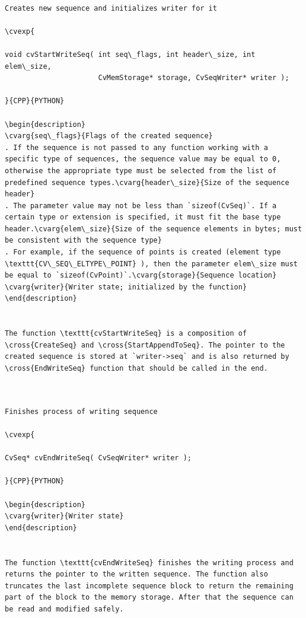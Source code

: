 \label{StartWriteSeq}
\begin{verbatim}

Creates new sequence and initializes writer for it

\cvexp{

void cvStartWriteSeq( int seq\_flags, int header\_size, int elem\_size,
                      CvMemStorage* storage, CvSeqWriter* writer );

}{CPP}{PYTHON}

\begin{description}
\cvarg{seq\_flags}{Flags of the created sequence}
. If the sequence is not passed to any function working with a specific type of sequences, the sequence value may be equal to 0, otherwise the appropriate type must be selected from the list of predefined sequence types.\cvarg{header\_size}{Size of the sequence header}
. The parameter value may not be less than `sizeof(CvSeq)`. If a certain type or extension is specified, it must fit the base type header.\cvarg{elem\_size}{Size of the sequence elements in bytes; must be consistent with the sequence type}
. For example, if the sequence of points is created (element type \texttt{CV\_SEQ\_ELTYPE\_POINT} ), then the parameter elem\_size must be equal to `sizeof(CvPoint)`.\cvarg{storage}{Sequence location}
\cvarg{writer}{Writer state; initialized by the function}
\end{description}


The function \texttt{cvStartWriteSeq} is a composition of \cross{CreateSeq} and \cross{StartAppendToSeq}. The pointer to the created sequence is stored at `writer->seq` and is also returned by \cross{EndWriteSeq} function that should be called in the end.


\end{verbatim}
\label{EndWriteSeq}
\begin{verbatim}

Finishes process of writing sequence

\cvexp{

CvSeq* cvEndWriteSeq( CvSeqWriter* writer );

}{CPP}{PYTHON}

\begin{description}
\cvarg{writer}{Writer state}
\end{description}


The function \texttt{cvEndWriteSeq} finishes the writing process and returns the pointer to the written sequence. The function also truncates the last incomplete sequence block to return the remaining part of the block to the memory storage. After that the sequence can be read and modified safely.


\end{verbatim}
